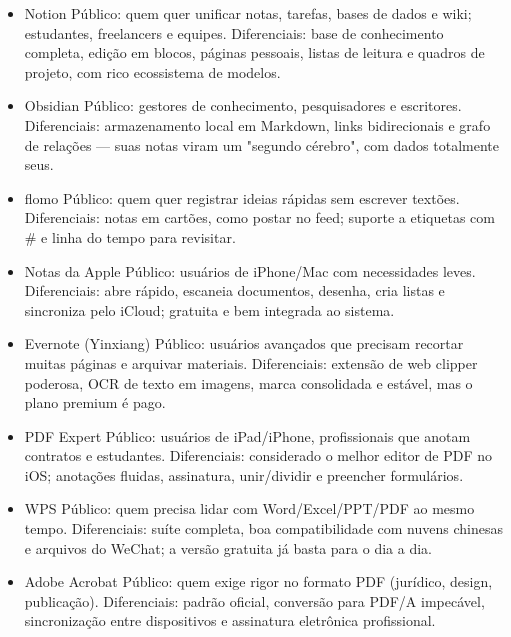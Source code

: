 \begin{itemize}
  \item Notion Público: quem quer unificar notas, tarefas, bases de dados e wiki; estudantes, freelancers e equipes. Diferenciais: base de conhecimento completa, edição em blocos, páginas pessoais, listas de leitura e quadros de projeto, com rico ecossistema de modelos.
  \item Obsidian Público: gestores de conhecimento, pesquisadores e escritores. Diferenciais: armazenamento local em Markdown, links bidirecionais e grafo de relações — suas notas viram um "segundo cérebro", com dados totalmente seus.
  \item flomo Público: quem quer registrar ideias rápidas sem escrever textões. Diferenciais: notas em cartões, como postar no feed; suporte a etiquetas com \# e linha do tempo para revisitar.
  \item Notas da Apple Público: usuários de iPhone/Mac com necessidades leves. Diferenciais: abre rápido, escaneia documentos, desenha, cria listas e sincroniza pelo iCloud; gratuita e bem integrada ao sistema.
  \item Evernote (Yinxiang) Público: usuários avançados que precisam recortar muitas páginas e arquivar materiais. Diferenciais: extensão de web clipper poderosa, OCR de texto em imagens, marca consolidada e estável, mas o plano premium é pago.
\end{itemize}


\begin{itemize}
  \item PDF Expert Público: usuários de iPad/iPhone, profissionais que anotam contratos e estudantes. Diferenciais: considerado o melhor editor de PDF no iOS; anotações fluidas, assinatura, unir/dividir e preencher formulários.
  \item WPS Público: quem precisa lidar com Word/Excel/PPT/PDF ao mesmo tempo. Diferenciais: suíte completa, boa compatibilidade com nuvens chinesas e arquivos do WeChat; a versão gratuita já basta para o dia a dia.
  \item Adobe Acrobat Público: quem exige rigor no formato PDF (jurídico, design, publicação). Diferenciais: padrão oficial, conversão para PDF/A impecável, sincronização entre dispositivos e assinatura eletrônica profissional.
\end{itemize}


